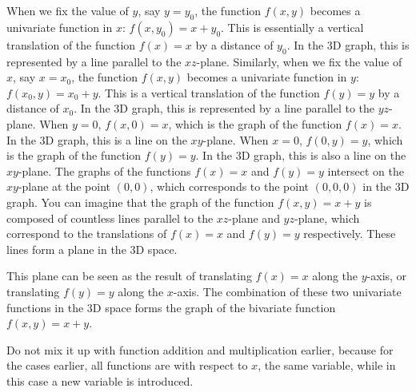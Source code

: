 \begin{example}
		When we fix the value of $y$, say $y = y_0$, the function $f(x, y)$ becomes a univariate function in $x$: $f(x, y_0) = x + y_0$. This is essentially a vertical translation of the function $f(x) = x$ by a distance of $y_0$. In the 3D graph, this is represented by a line parallel to the $xz$-plane.
		Similarly, when we fix the value of $x$, say $x = x_0$, the function $f(x, y)$ becomes a univariate function in $y$: $f(x_0, y) = x_0 + y$. This is a vertical translation of the function $f(y) = y$ by a distance of $x_0$. In the 3D graph, this is represented by a line parallel to the $yz$-plane.
		When $y = 0$, $f(x, 0) = x$, which is the graph of the function $f(x) = x$. In the 3D graph, this is a line on the $xy$-plane.
		When $x = 0$, $f(0, y) = y$, which is the graph of the function $f(y) = y$. In the 3D graph, this is also a line on the $xy$-plane.
		The graphs of the functions $f(x) = x$ and $f(y) = y$ intersect on the $xy$-plane at the point $(0, 0)$, which corresponds to the point $(0, 0, 0)$ in the 3D graph.
		You can imagine that the graph of the function $f(x, y) = x + y$ is composed of countless lines parallel to the $xz$-plane and $yz$-plane, which correspond to the translations of $f(x) = x$ and $f(y) = y$ respectively. These lines form a plane in the 3D space.
		
		This plane can be seen as the result of translating $f(x) = x$ along the $y$-axis, or translating $f(y) = y$ along the $x$-axis. The combination of these two univariate functions in the 3D space forms the graph of the bivariate function $f(x, y) = x + y$.
	    \end{example}
	    
	    \begin{remark}
	    	Do not mix it up with function addition and multiplication earlier, because for the cases earlier, all functions are with respect to $x$, the same variable,
	    	while in this case a new variable is introduced.
	    \end{remark}
	    
